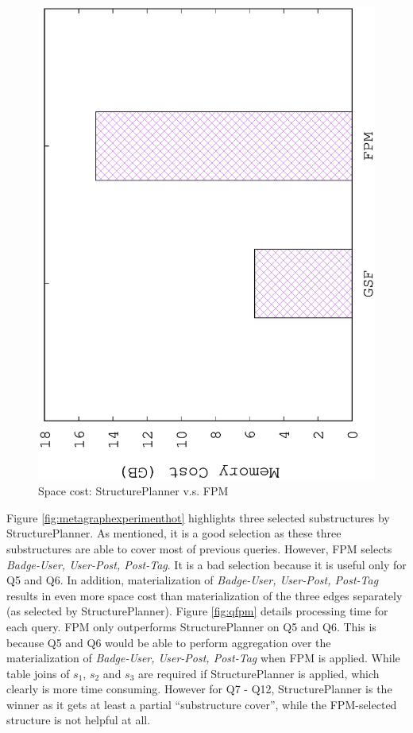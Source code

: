 \begin{figure}[H]
	\centering
	\includegraphics[scale=0.5, angle=270]{plot/fpm_space.eps}
	\caption{Space cost: StructurePlanner v.s. FPM}
	\label{fig:fpmspace}
\end{figure}

Figure \ref{fig:metagraphexperimenthot} highlights three selected substructures by StructurePlanner. As mentioned, it is a good selection as these three substructures are able to cover most of previous queries. However, FPM selects \textit{Badge-User, User-Post, Post-Tag}. It is a bad selection because it is useful only for Q5 and Q6. In addition, materialization of \textit{Badge-User, User-Post, Post-Tag} results in even more space cost than materialization of the three edges separately (as selected by StructurePlanner). Figure \ref{fig:qfpm} details processing time for each query. FPM only outperforms StructurePlanner on Q5 and Q6. This is because Q5 and Q6 would be able to perform aggregation over the materialization of \textit{Badge-User, User-Post, Post-Tag} when FPM is applied. While table joins of $s_1$, $s_2$ and $s_3$ are required if StructurePlanner is applied, which clearly is more time consuming. However for Q7 - Q12, StructurePlanner is the winner as it gets at least a partial ``substructure cover'', while the FPM-selected structure is not helpful at all.

